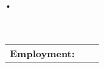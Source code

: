 \documentclass{letter}
\begin{document}
\linespread{1.15}
\renewcommand{\arraystretch}{1.15}

\newlength{\sizespace}
\newlength{\middleboxsize}
\setlength{\middleboxsize}{\paperwidth-\sizespace-1.8in}


\begin{center}
{ \Large \textbf{\MakeUppercase\myname} }

{\myaddress} • {\phone}\\ {\email}\\ {\mysite} \\[14pt]
\begin{tabulary}{\textwidth}{llr}
\\
{ \large \textbf{Employment:} } & 


\end{tabulary}
\end{center}
\end{document}
